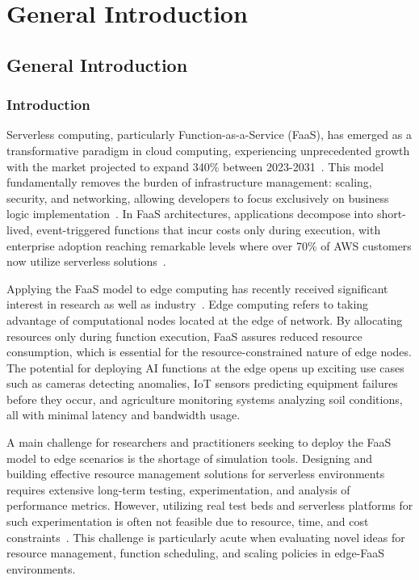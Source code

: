 \part{General Introduction}
\chapter{General Introduction}

\section{Introduction}

Serverless computing, particularly Function-as-a-Service (FaaS), has emerged as a transformative paradigm in cloud computing, experiencing unprecedented growth with the market projected to expand 340\% between 2023-2031~\cite{datam2024serverless}. This model fundamentally removes the burden of infrastructure management: scaling, security, and networking, allowing developers to focus exclusively on business logic implementation~\cite{baldini2017serverless}. In FaaS architectures, applications decompose into short-lived, event-triggered functions that incur costs only during execution, with enterprise adoption reaching remarkable levels where over 70\% of AWS customers now utilize serverless solutions~\cite{datadog2023serverless}.

Applying the FaaS model to edge computing has recently received significant interest in research as well as industry~\cite{aslanpour2021serverless}. Edge computing refers to taking advantage of computational nodes located at the edge of network. By allocating resources only during function execution, FaaS assures reduced resource consumption, which is essential for the resource-constrained nature of edge nodes. The potential for deploying AI functions at the edge opens up exciting use cases such as cameras detecting anomalies, IoT sensors predicting equipment failures before they occur, and agriculture monitoring systems analyzing soil conditions, all with minimal latency and bandwidth usage.

A main challenge for researchers and practitioners seeking to deploy the FaaS model to edge scenarios is the shortage of simulation tools. Designing and building effective resource management solutions for serverless environments requires extensive long-term testing, experimentation, and analysis of performance metrics. However, utilizing real test beds and serverless platforms for such experimentation is often not feasible due to resource, time, and cost constraints~\cite{mampage2021cloudsimsc}. This challenge is particularly acute when evaluating novel ideas for resource management, function scheduling, and scaling policies in edge-FaaS environments.

